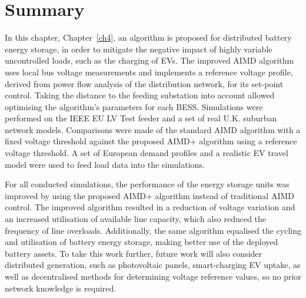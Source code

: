 \section{Summary}
\label{ch4:sec:summary}

In this chapter, Chapter~\ref{ch4}, an algorithm is proposed for distributed battery energy storage, in order to mitigate the negative impact of highly variable uncontrolled loads, such as the charging of EVs. The improved AIMD algorithm uses local bus voltage measurements and implements a reference voltage profile, derived from power flow analysis of the distribution network, for its set-point control. Taking the distance to the feeding substation into account allowed optimising the algorithm's parameters for each BESS. Simulations were performed on the IEEE EU LV Test feeder and a set of real U.K. suburban network models. Comparisons were made of the standard AIMD algorithm with a fixed voltage threshold against the proposed AIMD+ algorithm using a reference voltage threshold. A set of European demand profiles and a realistic EV travel model were used to feed load data into the simulations.

For all conducted simulations, the performance of the energy storage units was improved by using the proposed AIMD+ algorithm instead of traditional AIMD control. The improved algorithm resulted in a reduction of voltage variation and an increased utilisation of available line capacity, which also reduced the frequency of line overloads. Additionally, the same algorithm equalised the cycling and utilisation of battery energy storage, making better use of the deployed battery assets. To take this work further, future work will also consider distributed generation, such as photovoltaic panels, smart-charging EV uptake, as well as decentralised methods for determining voltage reference values, so no prior network knowledge is required.